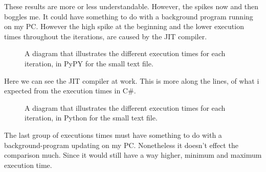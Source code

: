 \noindent These results are more or less understandable. However, the spikes now and then boggles me. It could have something to do with a background program running on my PC. However the high spike at the beginning and the lower execution times throughout the iterations, are caused by the JIT compiler.

\begin{figure}[H]
    \vspace*{-0.8cm}
    \caption{A diagram that illustrates the different execution times for each iteration, in PyPY for the small text file.}
\end{figure}

\noindent Here we can see the JIT compiler at work. This is more along the lines, of what i expected from the execution times in C\#.

\begin{figure}[H]
    \vspace*{-0.8cm}
    \caption{A diagram that illustrates the different execution times for each iteration, in Python for the small text file.}
\end{figure}

\noindent The last group of executions times must have something to do with a background-program updating on my PC. Nonetheless it doesn't effect the comparison much. Since it would still have a way higher, minimum and maximum execution time.